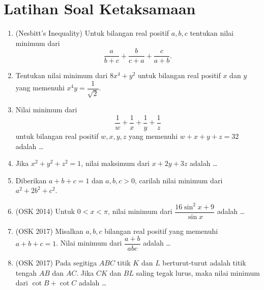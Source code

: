 \documentclass[12pt]{scrartcl}
\begin{document}
\section{Latihan Soal Ketaksamaan}
\begin{enumerate}
    \item (Nesbitt's Inequality) Untuk bilangan real positif $a,b,c$ tentukan nilai minimum dari $$\dfrac{a}{b+c}+\dfrac{b}{c+a}+\dfrac{c}{a+b}.$$
    
    \item Tentukan nilai minimum dari $8x^4+y^2$ untuk bilangan real positif $x$ dan $y$ yang memenuhi $x^4y=\dfrac{1}{\sqrt{2}}$.
    
    \item Nilai minimum dari $$\dfrac{1}{w}+\dfrac{1}{x}+\dfrac{1}{y}+\dfrac{1}{z}$$
    untuk bilangan real positif $w,x,y,z$ yang memenuhi $w+x+y+z=32$ adalah \dots
    
    \item Jika $x^2+y^2+z^2=1$, nilai maksimum dari $x+2y+3z$ adalah \dots
    
    \item Diberikan $a+b+c=1$ dan $a,b,c>0$, carilah nilai minimum dari $a^2+2b^2+c^2$.
    
    \item (OSK 2014) Untuk $0 < x < \pi$, nilai minimum dari $\dfrac{16 \sin^2 x + 9}{\sin x}$ adalah \dots
    
    \item (OSK 2017) Misalkan $a,b,c$ bilangan real positif yang memenuhi $a+b+c=1$. Nilai minimum dari $\dfrac{a+b}{abc}$ adalah \dots
    
    \item (OSK 2017) Pada segitiga $ABC$ titik $K$ dan $L$ berturut-turut adalah titik tengah $AB$ dan $AC$. Jika $CK$ dan $BL$ saling tegak lurus, maka nilai minimum dari $\cot B + \cot C$ adalah \dots
\end{enumerate}
\end{document}
